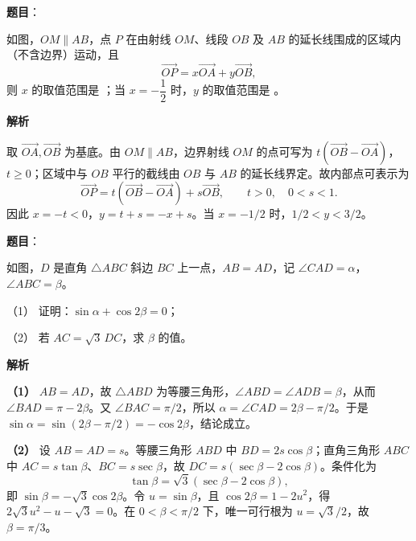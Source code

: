 \begin{answer}

\textbf{题目}：

如图，$OM\parallel AB$，点 $P$ 在由射线 $OM$、线段 $OB$ 及 $AB$ 的延长线围成的区域内（不含边界）运动，且
\nopagebreak[4]
\[
\overrightarrow{OP}=x\overrightarrow{OA}+y\overrightarrow{OB},
\]
则 $x$ 的取值范围是 \gkblank{}；当 $x=-\dfrac12$ 时，$y$ 的取值范围是 \gkblank{}。
\nopagebreak[4]
\begin{center}\end{center}
\nopagebreak[4]
\textbf{解析}

取 $\overrightarrow{OA},\overrightarrow{OB}$ 为基底。由 $OM\parallel AB$，边界射线 $OM$ 的点可写为 $t(\overrightarrow{OB}-\overrightarrow{OA})$，$t\ge0$；区域中与 $OB$ 平行的截线由 $OB$ 与 $AB$ 的延长线界定。故内部点可表示为
\nopagebreak[4]
\[
\overrightarrow{OP}=t(\overrightarrow{OB}-\overrightarrow{OA})+s\overrightarrow{OB},\qquad t>0,\quad0<s<1.
\]
因此 $x=-t<0$，$y=t+s=-x+s$。当 $x=-1/2$ 时，$1/2<y<3/2$。
\nopagebreak[4]
\begin{center}\end{center}
\nopagebreak[4]

\end{answer}
\begin{answer}

\textbf{题目}：

如图，$D$ 是直角 $\triangle ABC$ 斜边 $BC$ 上一点，$AB=AD$，记 $\angle CAD=\alpha$，$\angle ABC=\beta$。

（1） 证明：$\sin\alpha+\cos2\beta=0$；

（2） 若 $AC=\sqrt3\,DC$，求 $\beta$ 的值。
\nopagebreak[4]
\begin{center}\end{center}
\nopagebreak[4]
\textbf{解析}

\textbf{（1）} $AB=AD$，故 $\triangle ABD$ 为等腰三角形，$\angle ABD=\angle ADB=\beta$，从而 $\angle BAD=\pi-2\beta$。又 $\angle BAC=\pi/2$，所以 $\alpha=\angle CAD=2\beta-\pi/2$。于是 $\sin\alpha=\sin(2\beta-\pi/2)=-\cos2\beta$，结论成立。

\textbf{（2）} 设 $AB=AD=s$。等腰三角形 $ABD$ 中 $BD=2s\cos\beta$；直角三角形 $ABC$ 中 $AC=s\tan\beta$、$BC=s\sec\beta$，故 $DC=s(\sec\beta-2\cos\beta)$。条件化为
\nopagebreak[4]
\[
\tan\beta=\sqrt3(\sec\beta-2\cos\beta),
\]
即 $\sin\beta=-\sqrt3\cos2\beta$。令 $u=\sin\beta$，且 $\cos2\beta=1-2u^2$，得 $2\sqrt3u^2-u-\sqrt3=0$。在 $0<\beta<\pi/2$ 下，唯一可行根为 $u=\sqrt3/2$，故 $\beta=\pi/3$。
\nopagebreak[4]
\begin{center}\end{center}
\nopagebreak[4]


\end{answer}
